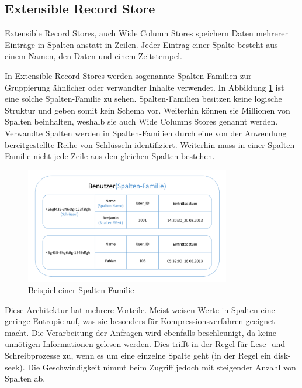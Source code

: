\subsection{Extensible Record Store}
\label{ch:grundlagen:sec:NoSQL:ExtensibleRecordStore}

Extensible Record Stores, auch Wide Column Stores speichern Daten mehrerer Einträge in Spalten anstatt in Zeilen. Jeder Eintrag einer Spalte besteht aus einem Namen, den Daten und einem Zeitstempel.

In Extensible Record Stores werden sogenannte Spalten-Familien zur Gruppierung ähnlicher oder verwandter Inhalte verwendet. In Abbildung \ref{wide_column_store} ist eine solche Spalten-Familie zu sehen. Spalten-Familien besitzen keine logische Struktur und geben somit kein Schema vor. Weiterhin können sie Millionen von Spalten beinhalten, weshalb sie auch Wide Columns Stores genannt werden. Verwandte Spalten werden in Spalten-Familien durch eine von der Anwendung bereitgestellte Reihe von Schlüsseln identifiziert. Weiterhin muss in einer Spalten-Familie nicht jede Zeile aus den gleichen Spalten bestehen.

\begin{figure}[htbp]
	\centering
  \includegraphics[width=0.8\textwidth, width=0.8\textwidth]{pics/wide_column_stores.pdf}
	\caption{Beispiel einer Spalten-Familie}
	\label{wide_column_store}
\end{figure}

Diese Architektur hat mehrere Vorteile. Meist weisen Werte in Spalten eine geringe Entropie auf, was sie besonders für Kompressionsverfahren geeignet macht. Die Verarbeitung der Anfragen wird ebenfalls beschleunigt, da keine unnötigen Informationen gelesen werden. Dies trifft in der Regel für Lese- und Schreibprozesse zu, wenn es um eine einzelne Spalte geht (in der Regel ein disk-seek). Die Geschwindigkeit nimmt beim Zugriff jedoch mit steigender Anzahl von Spalten ab.

